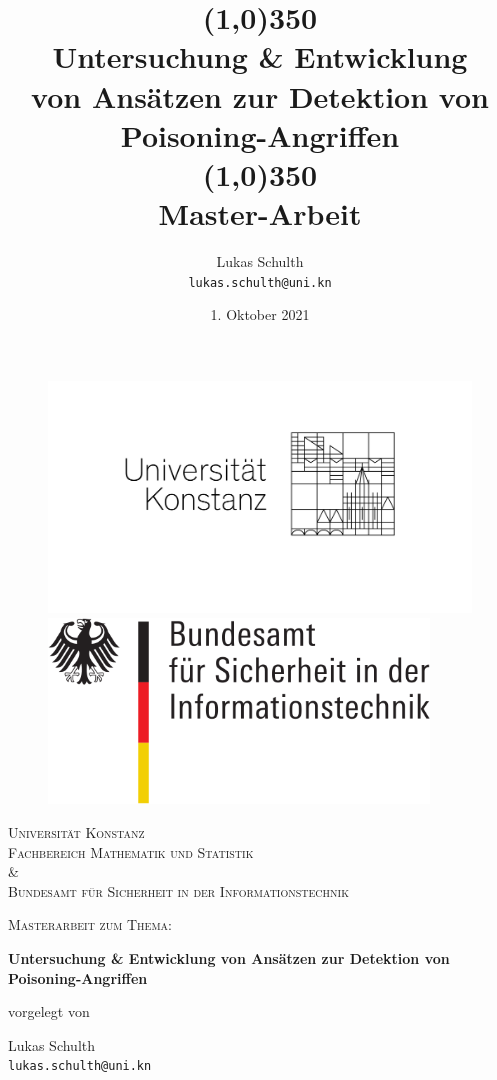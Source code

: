 \documentclass[11pt,a4paper]{article}
\title{\line(1,0){350}\\Untersuchung \& Entwicklung \\von Ansätzen zur Detektion von Poisoning-Angriffen\\\line(1,0){350}\\
	Master-Arbeit}
\author{
	Lukas Schulth\\
	\texttt{lukas.schulth@uni.kn}
}
\date{1. Oktober 2021}
\numberwithin{equation}{section}
\begin{document}
	\begin{titlepage}
		\thispagestyle{empty} 
		\begin{figure}
			\centering
			\begin{minipage}{0.45\textwidth}
				\centering
				\includegraphics[width=1.2\textwidth]{logounikn} %
				
			\end{minipage}\hfill
			\begin{minipage}{0.45\textwidth}
				\centering
				\includegraphics[width=0.9\textwidth]{bsi_logo} %
				
			\end{minipage}
		\end{figure}
		\centering
		\vspace{1cm}
		{\scshape\LARGE Universität Konstanz\\
			\large Fachbereich Mathematik und Statistik\\
			 \& \\ \LARGE Bundesamt für Sicherheit in der Informationstechnik \par}
		\vspace{1cm}
		{\scshape\Large Masterarbeit zum Thema:\par}
		\vspace{0.5cm}
		{\Huge \bfseries Untersuchung \& Entwicklung von Ansätzen zur Detektion von Poisoning-Angriffen\par} %
		\vspace{0.5cm}
		vorgelegt von \par
		\vspace{0.5cm}
		{\Large Lukas Schulth\\
			\texttt{lukas.schulth@uni.kn}\par}
	

\end{titlepage}
\end{document}
